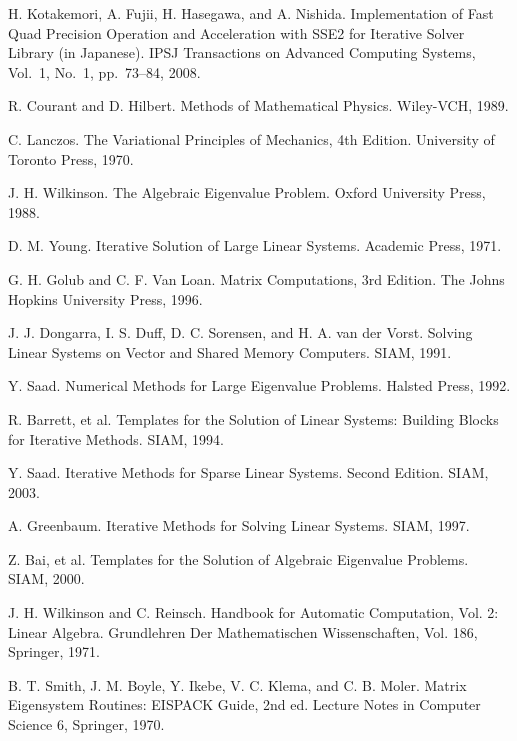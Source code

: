 \documentclass[a4paper]{jarticle}
\begin{document}
{\begin{thebibliography}{10}
H. Kotakemori, A. Fujii, H. Hasegawa, and A. Nishida.
\newblock Implementation of Fast Quad Precision Operation and
	Acceleration with SSE2 for Iterative Solver Library (in
	Japanese).
\newblock IPSJ Transactions on Advanced Computing Systems,  Vol.~1, No.~1, pp.\ 73--84, 2008.

R. Courant and D. Hilbert.
\newblock Methods of Mathematical Physics. 
\newblock Wiley-VCH, 1989.

C. Lanczos. 
\newblock The Variational Principles of Mechanics, 4th Edition. 
\newblock University of Toronto Press, 1970.

J. H. Wilkinson. 
\newblock The Algebraic Eigenvalue Problem. 
\newblock Oxford University Press, 1988.

D. M. Young. 
\newblock Iterative Solution of Large Linear Systems. 
\newblock Academic Press, 1971.

G. H. Golub and C. F. Van Loan.
\newblock Matrix Computations, 3rd Edition.
\newblock The Johns Hopkins University Press, 1996.

J. J. Dongarra, I. S. Duff, D. C. Sorensen, and H. A. van der Vorst.
\newblock Solving Linear Systems on Vector and Shared Memory Computers.
\newblock SIAM, 1991.

Y. Saad.
\newblock Numerical Methods for Large Eigenvalue Problems. 
\newblock Halsted Press, 1992.

R. Barrett, et al.
\newblock Templates for the Solution of Linear Systems: Building Blocks for Iterative Methods.
\newblock SIAM, 1994.

Y. Saad.
\newblock Iterative Methods for Sparse Linear Systems. Second Edition. 
\newblock SIAM, 2003.

A. Greenbaum.
\newblock Iterative Methods for Solving Linear Systems.
\newblock SIAM, 1997.

Z. Bai, et al.
\newblock Templates for the Solution of Algebraic Eigenvalue Problems. 
\newblock SIAM, 2000.

J. H. Wilkinson and C. Reinsch.
\newblock Handbook for Automatic Computation, Vol. 2: Linear Algebra.
\newblock Grundlehren Der Mathematischen Wissenschaften, Vol. 186, Springer, 1971.

B. T. Smith, J. M. Boyle, Y. Ikebe, V. C. Klema, and C. B. Moler.
\newblock Matrix Eigensystem Routines: EISPACK Guide, 2nd ed.
\newblock Lecture Notes in Computer Science 6, Springer, 1970.


\end{thebibliography}}
\end{document}
